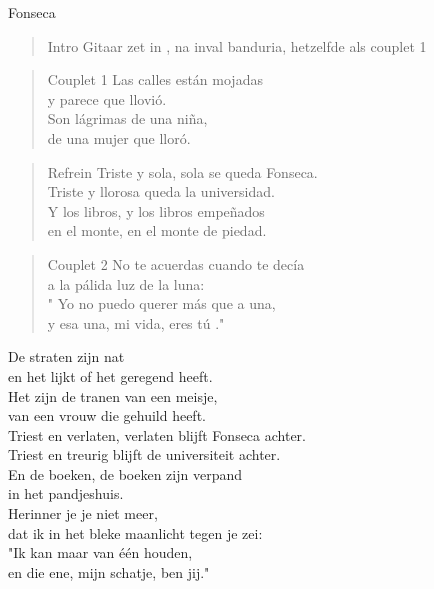\begin{song}[vals]{Fonseca}

\begin{verse}{Intro}
Gitaar zet in , na inval banduria, hetzelfde als couplet 1
\end{verse}
\begin{verse}{Couplet 1}
Las calles están mojadas\\
y parece que llovió.\\
Son lágrimas de una niña,\\
de una mujer que lloró.\\
\end{verse}

\begin{verse}{Refrein}
Triste y sola, sola se queda Fonseca.\\
Triste y llorosa queda la universidad.\\
Y los libros, y los libros empeñados\\
en el monte, en el monte de piedad.\\
\end{verse}

\begin{verse}{Couplet 2}
No te acuerdas cuando te decía\\
a la pálida luz de la luna:\\
\chord{}" Yo no puedo querer más que a una,\\
y esa una, mi vida, eres tú ."\\
\end{verse}

\end{song}
\begin{translation}
De straten zijn nat\\
en het lijkt of het geregend heeft.\\
Het zijn de tranen van een meisje,\\
van een vrouw die gehuild heeft.\\\vspace{1em}
Triest en verlaten, verlaten blijft Fonseca achter.\\
Triest en treurig blijft de universiteit achter.\\
En de boeken, de boeken zijn verpand\\
in het pandjeshuis.\\\vspace{1em}
Herinner je je niet meer,\\
dat ik in het bleke maanlicht tegen je zei:\\
"\hspace{0.1em}Ik kan maar van één houden,\\
en die ene, mijn schatje, ben jij."\\
\end{translation}
